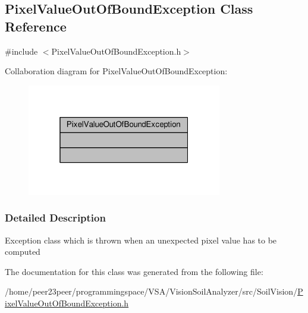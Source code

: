 \hypertarget{class_pixel_value_out_of_bound_exception}{}\subsection{Pixel\+Value\+Out\+Of\+Bound\+Exception Class Reference}
\label{class_pixel_value_out_of_bound_exception}


{\ttfamily \#include $<$Pixel\+Value\+Out\+Of\+Bound\+Exception.\+h$>$}



Collaboration diagram for Pixel\+Value\+Out\+Of\+Bound\+Exception\+:
\nopagebreak
\begin{figure}[H]
\begin{center}
\leavevmode
\includegraphics[width=241pt]{class_pixel_value_out_of_bound_exception__coll__graph}
\end{center}
\end{figure}


\subsubsection{Detailed Description}
Exception class which is thrown when an unexpected pixel value has to be computed 

The documentation for this class was generated from the following file\+:\begin{DoxyCompactItemize}
\item 
/home/peer23peer/programmingspace/\+V\+S\+A/\+Vision\+Soil\+Analyzer/src/\+Soil\+Vision/\hyperlink{_pixel_value_out_of_bound_exception_8h}{Pixel\+Value\+Out\+Of\+Bound\+Exception.\+h}\end{DoxyCompactItemize}
